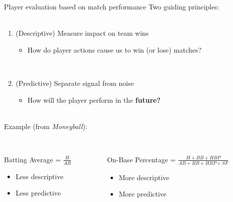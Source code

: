\documentclass[handout]{beamer}
\begin{document}
\begin{frame}{Player evaluation based on match performance}
  Two guiding principles:\\
  ~
  \begin{enumerate}
    \item (Descriptive) Measure impact on team wins\\
    \begin{itemize}
      \item How do player actions cause us to win (or lose) matches?
    \end{itemize}
    ~
    \item (Predictive) Separate signal from noise
    \begin{itemize}
      \item How will the player perform in the {\bf future?}
    \end{itemize}
  \end{enumerate}
  ~\\
  \pause
  Example (from {\it Moneyball}):\\
  ~\\
  \begin{columns}
    \begin{column}{0.35\textwidth}
      Batting Average = $\frac{H}{AB}$
      \begin{itemize}
        \item Less descriptive
        \item Less predictive
      \end{itemize}
    \end{column}
    \begin{column}{0.65\textwidth}
      On-Base Percentage = $\frac{H + BB + HBP}{AB + BB + HBP + SF}$
      \begin{itemize}
        \item More descriptive
        \item More predictive
      \end{itemize}
    \end{column}
  \end{columns}
\end{frame}
\end{document}
